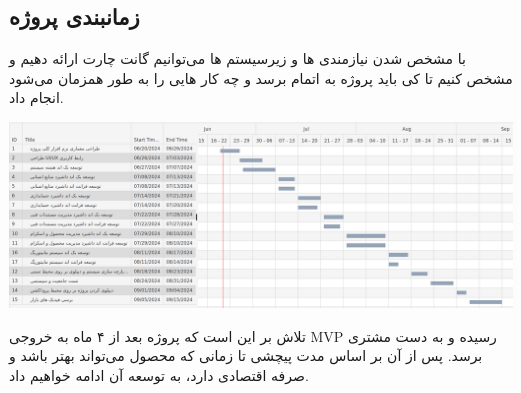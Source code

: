 \subsection{زمانبندی پروژه}
با مشخص شدن نیازمندی ها و زیرسیستم ها می‌توانیم گانت چارت ارائه دهیم و مشخص کنیم تا کی باید پروژه به اتمام برسد و چه کار هایی را به طور همزمان می‌شود انجام داد.

\includegraphics[scale=0.4]{assets/gantt_chart.png}

تلاش بر این است که پروژه بعد از ۴ ماه به خروجی MVP رسیده و به دست مشتری برسد. پس از آن بر اساس مدت پیچشی تا زمانی که محصول می‌تواند بهتر باشد
و صرفه اقتصادی دارد، به توسعه آن ادامه خواهیم داد.
